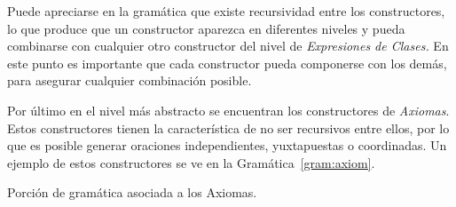 Puede apreciarse en la gramática que existe recursividad entre los constructores, lo que produce que un constructor aparezca en diferentes niveles y pueda combinarse con cualquier otro constructor del nivel de \textit{Expresiones de Clases.} En este punto es importante que cada constructor pueda componerse con los demás, para asegurar cualquier combinación posible.

Por último en el nivel más abstracto se encuentran los constructores de \textit{Axiomas}. Estos constructores tienen la característica de no ser recursivos entre ellos, por lo que es posible generar oraciones independientes, yuxtapuestas o coordinadas. Un ejemplo de estos constructores se ve en la Gramática~\ref{gram:axiom}.

\begin{GrammarEnv}
\begin{grammar}
[(colon){$\rightarrow$}]
[(semicolon)$|$]
[(comma){}]
[(period){\vspace{0.3cm} \\}]
[(quote){\begin{bf}}{\end{bf}}]
[(nonterminal){$<$}{$>$}]
\end{grammar}
\caption{Porción de gramática asociada a los Axiomas.}\label{gram:axiom}
\end{GrammarEnv}

